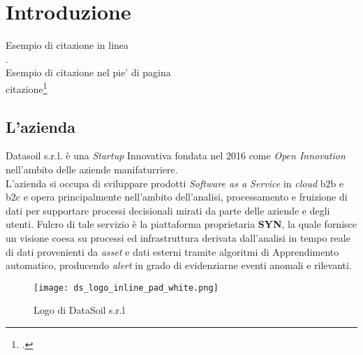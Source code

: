 
\chapter{Introduzione}
\label{cap:introduzione}


\noindent Esempio di citazione in linea \\
\cite{site:agile-manifesto}. \\

\noindent Esempio di citazione nel pie' di pagina \\
citazione\footcite{womak:lean-thinking} \\

\section{L'azienda}

Datasoil s.r.l. è una \textit{Startup} Innovativa fondata nel 2016 come \textit{Open Innovation} nell'ambito delle aziende manifaturriere.\\
L'azienda si occupa di sviluppare prodotti \textit{Software as a Service} in \textit{cloud} \gls{b2b} e \gls{b2c} e opera principalmente nell'ambito dell'analisi, processamento e fruizione di dati per supportare processi decisionali mirati da parte delle aziende e degli utenti. Fulcro di tale servizio è la piattaforma proprietaria \textbf{SYN}, la quale fornisce un visione coesa su processi ed infrastruttura derivata dall'analisi in tempo reale di dati provenienti da \textit{asset} e dati esterni tramite algoritmi di \gls{Apprendimento automatico}, producendo \textit{alert} in grado di evidenziarne eventi anomali e rilevanti.

\begin{figure}[!h] 
    \centering 
    \texttt{[image: ds\_logo\_inline\_pad\_white.png]} 
    \caption{Logo di DataSoil s.r.l}
\end{figure}

